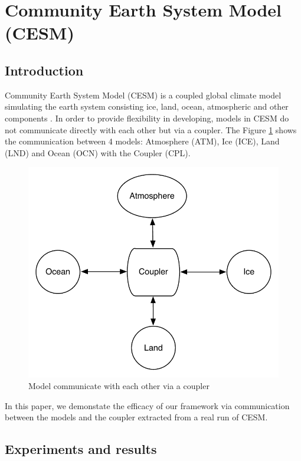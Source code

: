 \section{Community Earth System Model (CESM)}

\subsection{Introduction}

Community Earth System Model (CESM) is a coupled global climate model simulating the earth system consisting ice, land, ocean, atmospheric and other components \cite{CESM:Hurrell}. In order to provide flexibility in developing, models in CESM do not communicate directly with each other but via a coupler. The Figure \ref{fig:mct} shows the communication between 4 models: Atmosphere (ATM), Ice (ICE), Land (LND) and Ocean (OCN) with the Coupler (CPL).

\begin{figure}[!htb]
\vspace{-0.1in}
\centering
\includegraphics[scale=0.5]{figures/mct.pdf}
\vspace{-0.1in}
\caption{Model communicate with each other via a coupler}
\vspace{-0.1in}
\label{fig:mct}
\end{figure}

In this paper, we demonstate the efficacy of our framework via communication between the models and the coupler extracted from a real run of CESM.

\subsection{Experiments and results}




